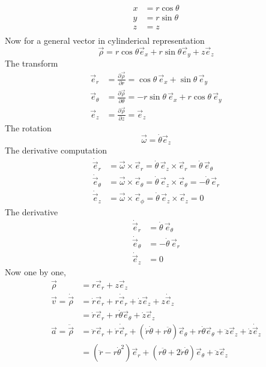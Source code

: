 \documentclass[10pts, letterpaper]{article}
\begin{document}
	      \begin{align*}
	      	x &=  r \cos \theta \\
		y &= r \sin \theta \\
		z &= z \\
	      \end{align*}
	     Now for a general vector in cylinderical representation 
	     \[
	     \vec{\rho} = r \cos \theta \vec{e}_x + r \sin \theta \vec{e}_y + z \vec{e}_z
	     \] 
The transform 
	     \begin{align*}
              \vec{e}_r &= \frac{\partial\vec{\rho}}{\partial r}
              = \cos\theta \, \vec{e}_x
              + \sin\theta \, \vec{e}_y \\
              \vec{e}_\theta &= \frac{\partial\vec{\rho}}{\partial\theta}
              = -r \sin\theta \, \vec{e}_x
              + r \cos\theta \, \vec{e}_y \\
              \vec{e}_z &= \frac{\partial\vec{\rho}}{\partial z}
              = \vec{e}_z
              \end{align*}
	      The rotation 
	      \[
	      \vec{\omega} = \dot \theta \vec{e}_z
	      \]
The derivative computation 
	      \begin{align*}
              \dot{\vec{e}}_r &= \vec{\omega} \times \vec{e}_r
              = \dot\theta \, \vec{e}_z \times \vec{e}_r
              = \dot{\theta} \, \vec{e}_\theta \\
              \dot{\vec{e}}_{\theta} &= \vec{\omega} \times \vec{e}_{\theta}
              = \dot\theta \, \vec{e}_z \times \vec{e}_\theta
              = - \dot\theta \, \vec{e}_r \\
              \dot{\vec{e}}_z &= \vec{\omega} \times \vec{e}_{\phi}
              = \dot\theta \, \vec{e}_z \times \vec{e}_z
              = 0
              \end{align*}
The derivative
	      \begin{align*}
              \dot{\vec{e}}_r &= \dot\theta \, \vec{e}_{\theta} \\
              \dot{\vec{e}}_{\theta} &= - \dot\theta \, \vec{e}_r \\
              \dot{\vec{e}}_z &= 0
              \end{align*}
	Now one by one, 
	\begin{align*}
		\vec{\rho} &= r \vec{e}_r + z \vec{e}_z \\	
		\vec{v} = \dot{\vec{\rho}} &= \dot{r} \vec{e}_r + r \dot\vec{e}_r + \dot{z} \vec{e}_z + z \dot \vec{e}_z\\
		&= \dot{r} \vec{e}_r + r \dot \theta \vec{e}_\theta + \dot{z} \vec{e}_z \\
		\vec{a} = \ddot{\vec{\rho}}&=  
\ddot{r} \vec{e}_r + 
\dot{r} \dot{\vec{e}}_r + 
(\dot r \dot \theta + r \ddot{\theta} ) \vec{e}_\theta + 
r \dot \theta \vec{e}_\theta + \ddot{z} \vec{e}_z + \dot{z} \dot{\vec{e}}_z 
		\\
		&= 
		(\ddot{r} - r \dot{\theta}^2) \vec{e}_r + 
		(r \ddot{\theta} + 2 \dot{r} \dot{\theta} ) \vec{e}_\theta + 
		\ddot{z} \vec{e}_z
		\\
	\end{align*}
\end{document}

